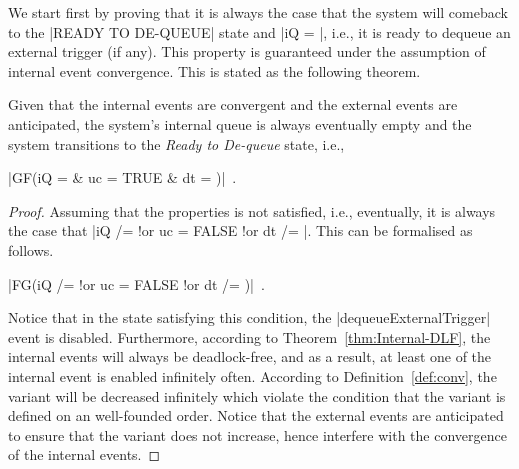 We start first by proving that it is always the case that the system
will comeback to the |READY TO DE-QUEUE| state and |iQ = {}|,
i.e., it is ready to dequeue an external trigger (if any).  This
property is guaranteed under the assumption of internal event
convergence.  This is stated as the following theorem.
\begin{theorem}
  \label{thm:finite-internal-events}
  Given that the internal events are convergent and the external
  events are anticipated, the system's internal queue is always
  eventually empty and the system transitions to the \emph{Ready to
    De-queue} state, i.e.,
  \begin{center}
    |GF(iQ = {} & uc = TRUE & dt = {})|~.
  \end{center}
\end{theorem}
\begin{proof}
  Assuming that the properties is not satisfied, i.e., eventually,
  it is always the case that %
  |iQ /= {} !or  uc = FALSE !or dt /=  {}|.  %
  This can be formalised as follows.
  \begin{center}
    |FG(iQ /= {} !or uc = FALSE !or dt /= {})|~.    
  \end{center}
  Notice that in the state satisfying this condition, the
  |dequeueExternalTrigger| event is disabled.  Furthermore, according
  to Theorem~\ref{thm:Internal-DLF}, the internal events
  will always be deadlock-free, and as a result, at least one
  of the internal event is enabled infinitely often. According to
  Definition~\ref{def:conv}, the variant will be decreased infinitely
  which violate the condition that the variant is defined on an
  well-founded order.  Notice that the external events are
  anticipated to ensure that the variant does not increase, hence
  interfere with the convergence of the internal events.
\end{proof}

